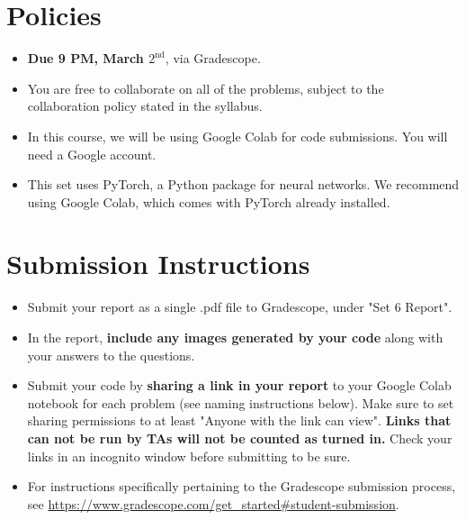 \newif\ifshowsolutions
\showsolutionstrue







\pagestyle{fancy}

\section*{Policies}
\begin{itemize}
  \item \textbf{Due 9 PM, March $2^\text{nd}$}, via Gradescope.
  \item You are free to collaborate on all of the problems, subject to the collaboration policy stated in the syllabus.
  \item In this course, we will be using Google Colab for code submissions. You will need a Google account.
  \item This set uses PyTorch, a Python package for neural networks. We recommend using Google Colab, which comes with PyTorch already installed.
\end{itemize}

\section*{Submission Instructions}
\begin{itemize}
\item Submit your report as a single .pdf file to Gradescope, under "Set 6 Report". 
	\item In the report, \textbf{include any images generated by your code} along with your answers to the questions.
	\item Submit your code by \textbf{sharing a link in your report} to your Google Colab notebook for each problem (see naming instructions below). Make sure to set sharing permissions to at least "Anyone with the link can view". \textbf{Links that can not be run by TAs will not be counted as turned in.} Check your links in an incognito window before submitting to be sure. 
	\item For instructions specifically pertaining to the Gradescope submission process, see \url{https://www.gradescope.com/get_started\#student-submission}.
\end{itemize}

